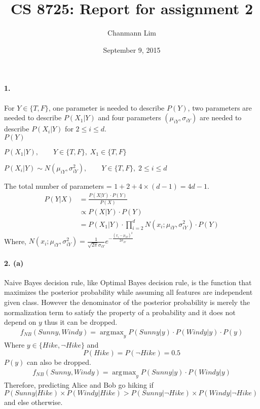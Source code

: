 \documentclass[a4paper]{article}
\DeclareMathOperator*{\argmax}{\arg\!\max}
\begin{document}
\title{CS 8725: Report for assignment 2}
\author{Chanmann Lim}
\date{September 9, 2015}
\maketitle

\paragraph{1.} For $Y \in \{T, F\}$, one parameter is needed to describe $P(Y)$, two parameters are needed to describe $P(X_1|Y)$ and four parameters $(\mu_{iY}, \sigma_{iY})$ are needed to describe $P(X_i|Y)$ for $2 \leq i \leq d$.\\

	$ P(Y) $
	
	$ P(X_1|Y), \qquad Y \in \{T, F\}, \; X_1 \in \{T, F\} $
	
	$ P(X_i|Y) \sim N(\mu_{iY}, \sigma_{iY}^2), \qquad Y \in \{T, F\}, \; 2 \leq i \leq d $
	
	The total number of parameters = $1 + 2 + 4 \times (d-1) = 4d - 1 $.	
	\begin{align}
		P(Y|X) &= \frac{P(X|Y) \cdot P(Y)}{P(X)} \\
			&\propto P(X|Y) \cdot P(Y) \\
			&= P(X_1|Y) \cdot \prod_{i=2}^d N(x_i; \mu_{iY}, \sigma_{iY}^2) \cdot P(Y)
	\end{align}
	Where, $N(x_i; \mu_{iY}, \sigma_{iY}^2) = \frac{1}{\sqrt{2\pi}\sigma_{iY}}e^{-\frac{(x_i-\mu_{iY})^2}{2\sigma_{iY}}}$

\paragraph{2. (a)} Naive Bayes decision rule, like Optimal Bayes decision rule, is the function that maximizes the posterior probability while assuming all features are independent given class. However the denominator of the posterior probability is merely the normalization term to satisfy the property of a probability and it does not depend on $y$ thus it can be dropped.\\
	\begin{align}
		f_{NB}(Sunny, Windy) = \argmax_{y} P(Sunny|y) \cdot P(Windy|y) \cdot P(y)
	\end{align}
	Where $y \in \{Hike, \neg Hike\}$ and 
	$$ P(Hike) = P(\neg Hike) = 0.5 $$
	$P(y)$ can also be dropped.
	\begin{align}
		f_{NB}(Sunny, Windy) = \argmax_{y} P(Sunny|y) \cdot P(Windy|y)
	\end{align}
	Therefore, predicting Alice and Bob go hiking if $P(Sunny|Hike) \times P(Windy|Hike) > P(Sunny|\neg Hike) \times P(Windy|\neg Hike)$ and else otherwise.
	
\end{document}
